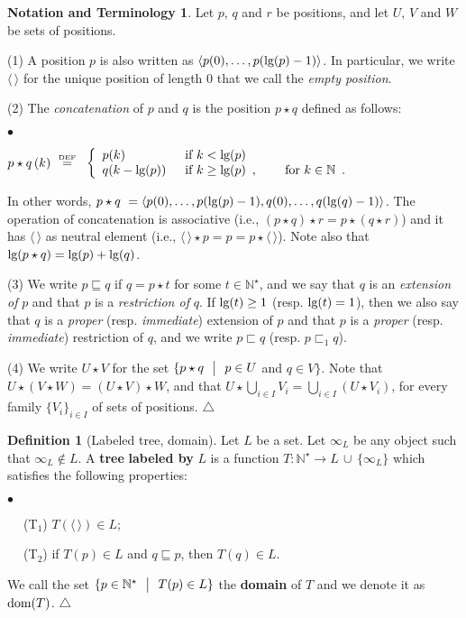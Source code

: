 \documentclass[copyright,creativecommons]{eptcs}
\def\ie{i.e., }
\newcommand{\vv}{\langle}
\newcommand{\ww}{\rangle}
\newcommand{\NN}{\mathbb{N}}
\newcommand{\eqdef}{\stackrel{\text{\tiny \textnormal{DEF}}}{=}}
\newcommand{\st}{ \ \ \big{|} \ \ }
\newcommand{\roo}{\vv \, \ww}
\newcommand{\len}{\textnormal{lg}}
\newcommand{\dom}{\ensuremath{\textnormal{dom}}}
\newcommand{\arr}{\longrightarrow}
\theoremstyle{definition}
\newtheorem{Definition}[theorem]{Definition}
\newtheorem{notation}[theorem]{Notation and Terminology}{\bfseries}{}
\newcommand{\squishlist}{
 \begin{list}{$\bullet$}
  { \setlength{\itemsep}{0pt}
     \setlength{\parsep}{3pt}
     \setlength{\topsep}{3pt}
     \setlength{\partopsep}{0pt}
     \setlength{\leftmargin}{1em}
     \setlength{\labelwidth}{1.5em}
     \setlength{\labelsep}{0.5em} } }
\newcommand{\squishend}{
  \end{list}  }
\begin{document}
\begin{notation} Let $p$, $ q$ and $r$ be positions,
and let $U$, $V$ and $W$ be sets of positions.

(1) A position  $p$ is also written  as $\vv p(0),\ldots,p(\len(p)-1)\ww$.
In particular, we write $\roo$ for the unique position of length $0$ that we call the \emph{empty position}.

(2)
The \emph{concatenation}
of  $p$ and $q$
is the position $p \star q$ defined as follows:

\squishlist
\item[] {\centering
$p \star q \, (k) \ \eqdef \ $ $\left\{
  \begin{array}{ll}
    p(k) \enspace&  \hbox{if $ k < \len(p)$} \\
    q(k - \len(p)) \enspace &  \hbox{if $  k \geq \len(p)$\enspace, \qquad for $k \in \NN$\enspace.}   \end{array}
\right.$ \par}
\squishend


\noindent In other words,
$p \star q \ = \vv p(0),\ldots,p(\len(p)-1), q(0),\ldots,q(\len(q)-1)\ww$.
The operation of concatenation
is associative (\ie $(p \star q) \star r = p \star (q \star r) $)
and it has $\roo$ as neutral element (\ie $\roo \star p = p = p \star \roo$). Note also that $\len(p \star q) = \len(p) + \len(q)$.



(3) We write $p \sqsubseteq q$     if
$q = p \star t$  for some $t \in \NN^\star$, and we
 say that $q$ is an \emph{extension of} $p$
and that $p$ is a \emph{restriction of} $q$.
If $ \len(t) \geq 1$ (resp. $ \len(t) = 1$), then we also say that $q$ is a \emph{proper}
(resp. \emph{immediate}) extension of $p$
and that $p$ is a  \emph{proper} (resp. \emph{immediate})  restriction of $q$, and we write $p \sqsubset q$ (resp. $p \sqsubset_1 q$).


(4) We write $U\star V$
for the set
$\{ p \star q  \st  p \in U $  and $q \in V\}$.
Note that $U \star (V \star W) = (U \star  V) \star W $,
and that $ U \star \bigcup_{ i \in I} V_i = \bigcup_{i \in I} (U \star V_i)$, for every family $\{V_i\}_{i \in I}$ of sets
of positions.
 \hfill $\triangle$
\end{notation}








\begin{Definition}[Labeled tree, domain] \label{tree}  Let $L$ be a set.
Let $\infty_L$ be any object such that
$\infty_L \notin L$.
A \textbf{tree}  \textbf{labeled by} $L$ is a function
$T : \NN^\star \arr L \, \cup \, \{ \infty_L \}$
which satisfies the following properties:
\squishlist
\item[$\phantom{ab}$ (T$_1$)] $T(\roo) \in L$;
\item[$\phantom{ab}$ (T$_2$)]  if $T(p) \in L$ and $q \sqsubseteq p$,  then $T(q) \in L$.
\squishend
We call  the set $\{ p \in \NN^\star \st T(p) \in L \}$ the \textbf{domain}
of $T$ and we denote it as $\dom(T)$. \hfill $\triangle$
\end{Definition}
\end{document}
